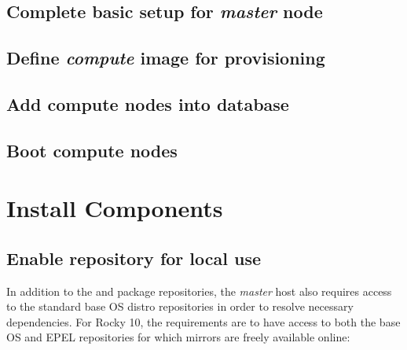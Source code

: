 \documentclass[letterpaper]{article}
\newcommand{\baseOS}{Rocky 10}
\begin{document}
\vspace*{-0.15cm}
\subsection{Complete basic \xCAT{} setup for {\em master} node} \label{sec:setup_xcat}



\subsection{Define {\em compute} image for provisioning}


\clearpage
\subsection{Add compute nodes into \xCAT{} database} \label{sec:xcat_add_nodes}


\subsection{Boot compute nodes} \label{sec:boot_computes}





\section{Install \OHPC{} Components} \label{sec:basic_install}



\subsection{Enable \OHPC{} repository for local use} \label{sec:enable_repo}




In addition to the \OHPC{} and \xCAT{} package repositories, the {\em master} host also
requires access to the standard base OS distro repositories in order to resolve
necessary dependencies. For \baseOS{}, the requirements are to have access to
both the base OS and EPEL repositories for which mirrors are freely available online:
\end{document}
